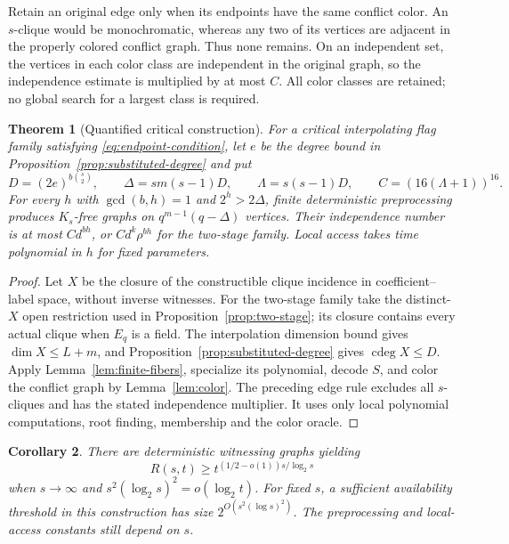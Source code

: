 \documentclass[11pt,a4paper]{article}
\DeclareMathOperator{\cdeg}{cdeg}
\newtheorem{theorem}{Theorem}[section]
\newtheorem{corollary}[theorem]{Corollary}
\theoremstyle{definition}
\theoremstyle{remark}
\numberwithin{equation}{section}
\begin{document}
Retain an original edge only when its endpoints have the same conflict color. An $s$-clique would be monochromatic, whereas any two of its vertices are adjacent in the properly colored conflict graph. Thus none remains. On an independent set, the vertices in each color class are independent in the original graph, so the independence estimate is multiplied by at most $C$. All color classes are retained; no global search for a largest class is required.

\begin{theorem}[Quantified critical construction]\label{thm:quantified}
For a critical interpolating flag family satisfying \eqref{eq:endpoint-condition}, let $e$ be the degree bound in Proposition~\ref{prop:substituted-degree} and put
\begin{equation}\label{eq:quantitative-constants}
D=(2e)^{b\binom s2},\qquad
\Delta=s m(s-1)D,\qquad\Lambda=s(s-1)D,\qquad C=(16(\Lambda+1))^{16}.
\end{equation}
For every $h$ with $\gcd(b,h)=1$ and $2^h>2\Delta$, finite deterministic preprocessing produces $K_s$-free graphs on $q^{m-1}(q-\Delta)$ vertices. Their independence number is at most $C d^{bh}$, or $C d^k\rho^{bh}$ for the two-stage family. Local access takes time polynomial in $h$ for fixed parameters.
\end{theorem}

\begin{proof}
Let $X$ be the closure of the constructible clique incidence in coefficient--label space, without inverse witnesses. For the two-stage family take the distinct-$X$ open restriction used in Proposition~\ref{prop:two-stage}; its closure contains every actual clique when $E_q$ is a field. The interpolation dimension bound gives $\dim X\le L+m$, and Proposition~\ref{prop:substituted-degree} gives $\cdeg X\le D$. Apply Lemma~\ref{lem:finite-fibers}, specialize its polynomial, decode $S$, and color the conflict graph by Lemma~\ref{lem:color}. The preceding edge rule excludes all $s$-cliques and has the stated independence multiplier. It uses only local polynomial computations, root finding, membership and the color oracle.
\end{proof}

\begin{corollary}\label{cor:growing-range}
There are deterministic witnessing graphs yielding
\[
R(s,t)\ge t^{(1/2-o(1))s/\log_2s}
\]
when $s\to\infty$ and $s^2(\log_2s)^2=o(\log_2t)$. For fixed $s$, a sufficient availability threshold in this construction has size $2^{O(s^2(\log s)^2)}$. The preprocessing and local-access constants still depend on $s$.
\end{corollary}
\end{document}
